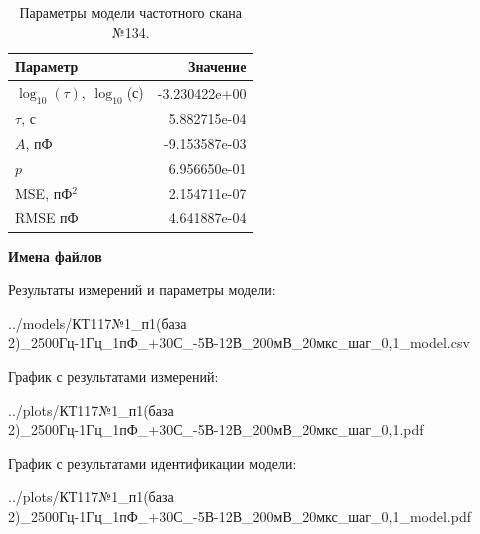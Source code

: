 \begin{table}[!ht]
    \centering
    \caption{Параметры модели частотного скана №134.}
    \begin{tabular}{|l|r|}
        \hline
        Параметр                                       & Значение                  \\ \hline
        $\log_{10}(\tau)$, $\log_{10}$(с)              & -3.230422e+00             \\ \hline
        $\tau$, с                                      & 5.882715e-04              \\ \hline
        $A$, пФ                                        & -9.153587e-03             \\ \hline
        $p$                                            & 6.956650e-01              \\ \hline
        MSE, пФ$^2$                                    & 2.154711e-07              \\ \hline
        RMSE пФ                                        & 4.641887e-04              \\ \hline
    \end{tabular}
    \label{table:frequency_scan_model_134}
\end{table}

\textbf{Имена файлов}

Результаты измерений и параметры модели:

\scriptsize../models/КТ117№1\_п1(база 2)\_2500Гц-1Гц\_1пФ\_+30С\_-5В-12В\_200мВ\_20мкс\_шаг\_0,1\_model.csv
\normalsize

График с результатами измерений:

\scriptsize../plots/КТ117№1\_п1(база 2)\_2500Гц-1Гц\_1пФ\_+30С\_-5В-12В\_200мВ\_20мкс\_шаг\_0,1.pdf
\normalsize

График с результатами идентификации модели:

\scriptsize../plots/КТ117№1\_п1(база 2)\_2500Гц-1Гц\_1пФ\_+30С\_-5В-12В\_200мВ\_20мкс\_шаг\_0,1\_model.pdf
\normalsize

